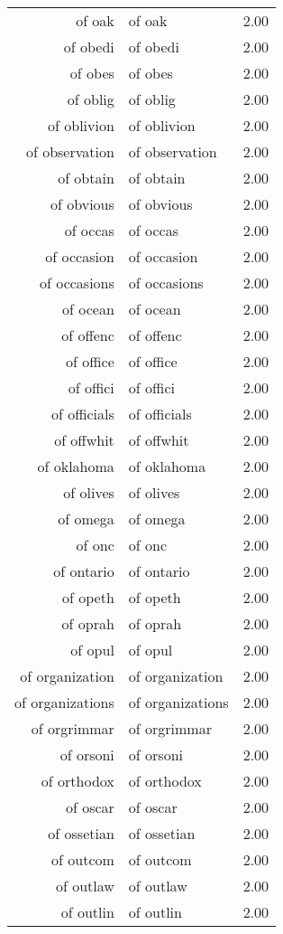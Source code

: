 \begin{table}[ht]
\begin{tabular}{rlr}
  of oak & of oak & 2.00 \\ 
  of obedi & of obedi & 2.00 \\ 
  of obes & of obes & 2.00 \\ 
  of oblig & of oblig & 2.00 \\ 
  of oblivion & of oblivion & 2.00 \\ 
  of observation & of observation & 2.00 \\ 
  of obtain & of obtain & 2.00 \\ 
  of obvious & of obvious & 2.00 \\ 
  of occas & of occas & 2.00 \\ 
  of occasion & of occasion & 2.00 \\ 
  of occasions & of occasions & 2.00 \\ 
  of ocean & of ocean & 2.00 \\ 
  of offenc & of offenc & 2.00 \\ 
  of office & of office & 2.00 \\ 
  of offici & of offici & 2.00 \\ 
  of officials & of officials & 2.00 \\ 
  of offwhit & of offwhit & 2.00 \\ 
  of oklahoma & of oklahoma & 2.00 \\ 
  of olives & of olives & 2.00 \\ 
  of omega & of omega & 2.00 \\ 
  of onc & of onc & 2.00 \\ 
  of ontario & of ontario & 2.00 \\ 
  of opeth & of opeth & 2.00 \\ 
  of oprah & of oprah & 2.00 \\ 
  of opul & of opul & 2.00 \\ 
  of organization & of organization & 2.00 \\ 
  of organizations & of organizations & 2.00 \\ 
  of orgrimmar & of orgrimmar & 2.00 \\ 
  of orsoni & of orsoni & 2.00 \\ 
  of orthodox & of orthodox & 2.00 \\ 
  of oscar & of oscar & 2.00 \\ 
  of ossetian & of ossetian & 2.00 \\ 
  of outcom & of outcom & 2.00 \\ 
  of outlaw & of outlaw & 2.00 \\ 
  of outlin & of outlin & 2.00 \\ 

\end{tabular}
\end{table}
